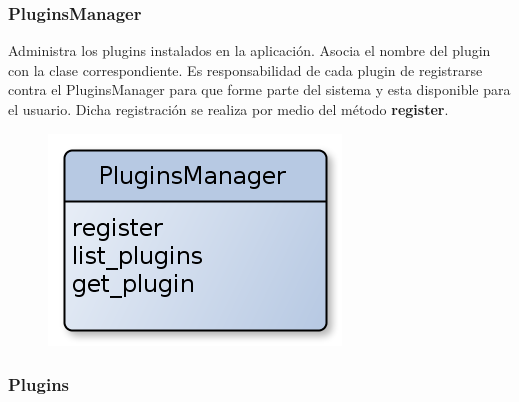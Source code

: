 \subsubsection{PluginsManager}

Administra los plugins instalados en la aplicación. Asocia el nombre del plugin con la clase correspondiente. Es responsabilidad de cada plugin de registrarse contra el PluginsManager para que forme parte del sistema y esta disponible para el usuario. Dicha registración se realiza por medio del método \textbf{register}.

\begin{figure}[hbtp]
    \centering
	\includegraphics[scale=0.40]{img/PluginsManager.png} 
\end{figure}

\subsubsection{Plugins}

